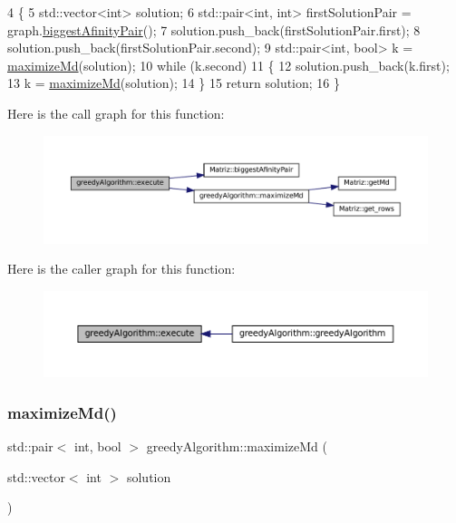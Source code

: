 \begin{DoxyCode}
4 \{
5   std::vector<int> solution;
6   std::pair<int, int> firstSolutionPair = graph.\hyperlink{classMatriz_a30e8aba7a2868aaa98f11d3037ff8319}{biggestAfinityPair}();
7   solution.push\_back(firstSolutionPair.first);
8   solution.push\_back(firstSolutionPair.second);
9   std::pair<int, bool> k = \hyperlink{classgreedyAlgorithm_a4968e1371d2fdfb1b1b6f24b57dd1f07}{maximizeMd}(solution);
10   \textcolor{keywordflow}{while} (k.second)
11   \{
12     solution.push\_back(k.first);
13     k = \hyperlink{classgreedyAlgorithm_a4968e1371d2fdfb1b1b6f24b57dd1f07}{maximizeMd}(solution);
14   \}
15   \textcolor{keywordflow}{return} solution;
16 \}
\end{DoxyCode}
Here is the call graph for this function\+:
\nopagebreak
\begin{figure}[H]
\begin{center}
\leavevmode
\includegraphics[width=350pt]{classgreedyAlgorithm_a37c81600b24a32ae25b6f0eeab643a7a_cgraph}
\end{center}
\end{figure}
Here is the caller graph for this function\+:
\nopagebreak
\begin{figure}[H]
\begin{center}
\leavevmode
\includegraphics[width=350pt]{classgreedyAlgorithm_a37c81600b24a32ae25b6f0eeab643a7a_icgraph}
\end{center}
\end{figure}
\mbox{\label{classgreedyAlgorithm_a4968e1371d2fdfb1b1b6f24b57dd1f07}} 
\subsubsection{\texorpdfstring{maximize\+Md()}{maximizeMd()}}
{\footnotesize\ttfamily std\+::pair$<$ int, bool $>$ greedy\+Algorithm\+::maximize\+Md (\begin{DoxyParamCaption}\item[{std\+::vector$<$ int $>$}]{solution }\end{DoxyParamCaption})}



